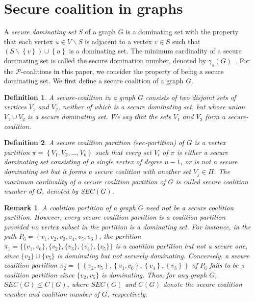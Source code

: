 \documentclass[12pt]{article}
\newtheorem{remark}[theorem]{Remark}
\newtheorem{definition}{Definition}
\begin{document}
    \section{Secure coalition in graphs}
    A \textit{secure dominating set} $S$ of a graph $G$ is a dominating set with the property that each vertex $u\in V\backslash S$ is adjacent to a vertex $v\in S$ such that $\left(S\backslash\left\{v\right\}\right)\cup \left\{u\right\}$ is a dominating set. The minimum cardinality of a secure dominating set is called the secure domination number, denoted by $\gamma_s(G)$~\cite{cockayne2005protection}. For the $\mathcal{P}$-coalitions in this paper, we consider the property of being a secure dominating set. We first define a secure coalition of a graph $G$.
\begin{definition}
A \textit{secure-coalition} in a graph $G$ consists of two disjoint sets of vertices $V_1$ and $V_2$, neither of which is a secure dominating set, but whose union $V_1 \cup V_2$ is a secure dominating set. We say that the sets $V_1$ and $V_2$ form a secure-coalition.\end{definition}
    \begin{definition}A \textit{secure coalition partition} ($sec$-partition) of $G$ is a vertex partition $\pi=\left\{V_1, V_2,\dots, V_k\right\}$ such that every set $V_i$ of $\pi$ is either a secure dominating set consisting of a single vertex of degree $n-1$, or is not a secure dominating set but it forms a secure coalition with another set $V_j\in \Pi$. The maximum cardinality of a secure coalition partition of $G$ is called \textit{secure coalition number} of $G$, denoted by $SEC(G)$.
    \end{definition}
    \begin{remark} A coalition partition of a graph $G$ need not be a secure coalition partition. 
    However, every secure coalition partition is a coalition partition provided no vertex subset in the partition is a dominating set. For instance, in the path $P_6=(v_1,v_2,v_3,v_4,v_5,v_6)$, 
    the partition $\pi_1=\{\{v_1,v_6\},\{v_2\},\{v_3\},\{v_4\},\{v_5\}\}$  is a coalition partition but not a secure one, since $\{v_2\}\cup\{v_5\}$ is dominating but not securely dominating. Conversely, a secure coalition partition $\pi_2=\left\{\left\{v_2,v_5\right\},\left\{v_1,v_6\right\},\left\{v_4\right\},\left\{v_3\right\}\right\}$ of $P_6$ 
    fails to be a coalition partition since $\{v_2,v_5\}$ is dominating. Thus, for any graph $G$, $SEC(G) \le C(G)$,
    where $SEC(G)$ and $C(G)$ denote the secure coalition number and coalition number of $G$, respectively.
\end{remark}
\end{document}
